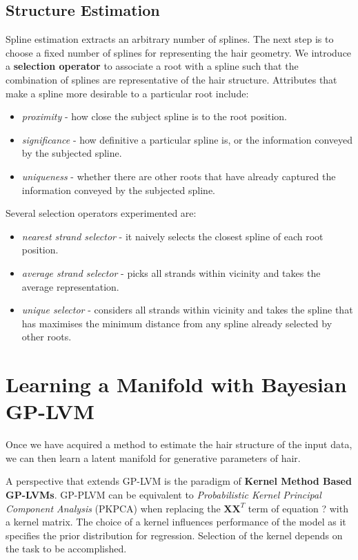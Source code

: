 \documentclass[ %
author={Dillon Keith Diep},
supervisor={Dr. Carl Henrik Ek},
degree={MEng},
title={ART-CG:},
subtitle={Assisted Real-time Content Generation of 3D Hair by Learning Manifolds},
type={Research},
year={2017} ]{dissertation}
\begin{document}
\subsection{Structure Estimation}
Spline estimation extracts an arbitrary number of splines. The next step is to choose a fixed number of splines for representing the hair geometry. We introduce a \textbf{selection operator} to associate a root with a spline such that the combination of splines are representative of the hair structure. Attributes that make a spline more desirable to a particular root include:
\begin{itemize}
	\item \textit{proximity} - how close the subject spline is to the root position.
	\item \textit{significance} - how definitive a particular spline is, or the information conveyed by the subjected spline.
	\item \textit{uniqueness} - whether there are other roots that have already captured the information conveyed by the subjected spline.
\end{itemize}
Several selection operators experimented are:
\begin{itemize}
	\item \textit{nearest strand selector} - it naively selects the closest spline of each root position. 
	\item \textit{average strand selector} - picks all strands within vicinity and takes the average representation.
	\item \textit{unique selector} - considers all strands within vicinity and takes the spline that has maximises the minimum distance from any spline already selected by other roots.
\end{itemize}

\section{Learning a Manifold with Bayesian GP-LVM}
Once we have acquired a method to estimate the hair structure of the input data, we can then learn a latent manifold for generative parameters of hair.

A perspective that extends GP-LVM is the paradigm of \textbf{Kernel Method Based GP-LVMs}\cite{reviewgplvm}.  GP-PLVM can be equivalent to \textit{Probabilistic Kernel Principal Component Analysis} (PKPCA) when replacing the $\bm{XX}^T$ term of equation ? with a kernel matrix. The choice of a kernel influences performance of the model as it specifies the prior distribution for regression. Selection of the kernel depends on the task to be accomplished.
\end{document}
